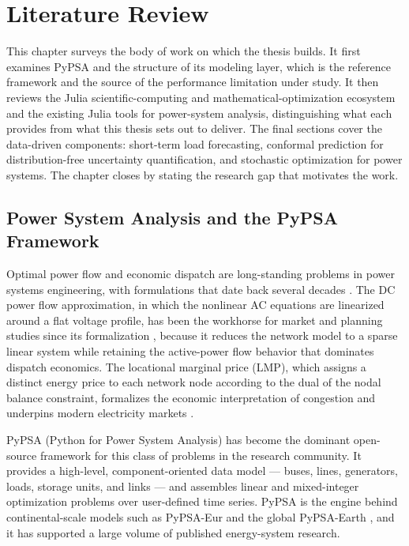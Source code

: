 \chapter{Literature Review}
\label{ch:litreview}

This chapter surveys the body of work on which the thesis builds. It first examines PyPSA and the structure of its modeling layer, which is the reference framework and the source of the performance limitation under study. It then reviews the Julia scientific-computing and mathematical-optimization ecosystem and the existing Julia tools for power-system analysis, distinguishing what each provides from what this thesis sets out to deliver. The final sections cover the data-driven components: short-term load forecasting, conformal prediction for distribution-free uncertainty quantification, and stochastic optimization for power systems. The chapter closes by stating the research gap that motivates the work.

\section{Power System Analysis and the PyPSA Framework}

Optimal power flow and economic dispatch are long-standing problems in power systems engineering, with formulations that date back several decades \cite{wood2013powergeneration,kundur1994power}. The DC power flow approximation, in which the nonlinear AC equations are linearized around a flat voltage profile, has been the workhorse for market and planning studies since its formalization \cite{stott1974dc}, because it reduces the network model to a sparse linear system while retaining the active-power flow behavior that dominates dispatch economics. The locational marginal price (LMP), which assigns a distinct energy price to each network node according to the dual of the nodal balance constraint, formalizes the economic interpretation of congestion and underpins modern electricity markets \cite{oneill2005,schweppe1988}.

PyPSA (Python for Power System Analysis) \cite{brown2018pypsa} has become the dominant open-source framework for this class of problems in the research community. It provides a high-level, component-oriented data model --- buses, lines, generators, loads, storage units, and links --- and assembles linear and mixed-integer optimization problems over user-defined time series. PyPSA is the engine behind continental-scale models such as PyPSA-Eur \cite{horsch2018pypsa_eur} and the global PyPSA-Earth \cite{parzen2023pypsaearth}, and it has supported a large volume of published energy-system research.


